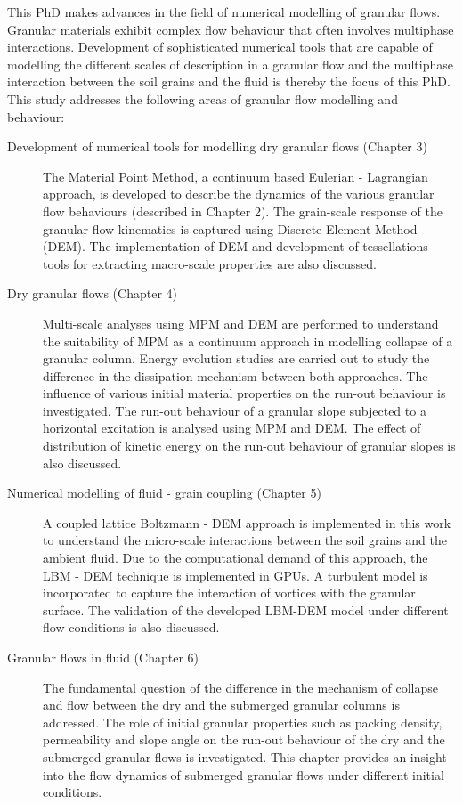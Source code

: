 This PhD makes advances in the field of numerical modelling of granular flows. 
Granular materials exhibit complex flow behaviour that often involves 
multiphase interactions. Development of sophisticated numerical tools that are 
capable of modelling the different scales of description in a granular flow and 
the multiphase interaction between the soil grains and the fluid is thereby the 
focus of this PhD. This study addresses the following 
areas of granular flow modelling and behaviour:
%
\begin{description}
\item[Development of numerical tools for modelling dry granular flows (Chapter 
3)]{The Material Point Method, a continuum based Eulerian - Lagrangian 
approach, is developed to describe the dynamics of the various granular flow 
behaviours (described in Chapter 2). The grain-scale response of the granular 
flow kinematics is captured using Discrete Element Method (DEM). The 
implementation of DEM and development of tessellations tools for extracting 
macro-scale properties are also discussed.}

\item[Dry granular flows (Chapter 4)] {Multi-scale analyses using MPM and DEM 
are performed to understand the suitability of MPM as a continuum approach in 
modelling collapse of a granular column. Energy evolution studies are carried 
out to study the difference in the dissipation mechanism between both 
approaches. The influence of various initial material properties on the run-out 
behaviour is investigated. The run-out behaviour of a granular slope subjected 
to a horizontal excitation is analysed using MPM and DEM. The effect of 
distribution of kinetic energy on the run-out behaviour of granular slopes is 
also discussed.}

\item[Numerical modelling of fluid - grain coupling (Chapter 5)]{A coupled 
lattice Boltzmann - DEM approach is implemented in this work to understand the 
micro-scale interactions between the soil grains and the ambient fluid. Due to 
the computational demand of this approach, the LBM - DEM technique is 
implemented in GPUs. A turbulent model is incorporated to capture the
interaction of vortices with the granular surface. The validation of 
the developed LBM-DEM model under different flow conditions is also discussed.}

\item[Granular flows in fluid (Chapter 6)]{The fundamental question of the 
difference in the mechanism of collapse and flow between the dry and the 
submerged granular columns is addressed. The role of initial granular 
properties such as packing density, permeability and slope angle on the run-out 
behaviour of the dry and the submerged granular flows is investigated. This 
chapter provides an insight into the flow dynamics of submerged granular flows 
under different initial conditions.
}
\end{description}

